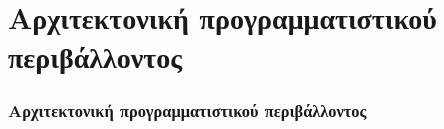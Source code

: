 \section{Αρχιτεκτονική προγραμματιστικού περιβάλλοντος}
\begin{frame}
	\frametitle{Αρχιτεκτονική προγραμματιστικού περιβάλλοντος}
\end{frame}
